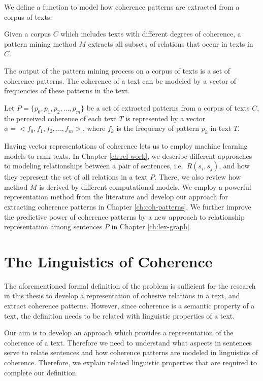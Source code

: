 We define a function to model how coherence patterns are extracted from a corpus of texts. 

\begin{definition}
Given a corpus $C$ which includes texts with different degrees of coherence, a pattern mining method $M$ extracts all subsets of relations that occur in texts in $C$. 
\end{definition} 

The output of the pattern mining process on a corpus of texts is a set of coherence patterns. 
The coherence of a text can be modeled by a vector of frequencies of these patterns in the text. 

\begin{definition}
Let $P=\lbrace p_0,p_1,p_2,...,p_m \rbrace$ be a set of extracted patterns from a corpus of texts $C$, the perceived coherence of each text $T$ is represented by a vector $\phi = <f_0, f_1, f_2,...,f_m>$, where $f_k$ is the frequency of pattern $p_k$ in text $T$. 
\end{definition}

Having vector representations of coherence lets us to employ machine learning models to rank texts. 
In Chapter \ref{ch:rel-work}, we describe different approaches to modeling relationships between a pair of sentences, i.e.\ $R(s_i,s_j)$, and how they represent the set of all relations in a text $P$.  
There, we also review how method $M$ is derived by different computational models. 
We employ a powerful representation method from the literature and develop our approach for extracting coherence patterns in Chapter \ref{ch:coh-patterns}. 
We further improve the predictive power of coherence patterns by a new approach to relationship representation among sentences $P$ in Chapter \ref{ch:lex-graph}. 

\section{The Linguistics of Coherence}

The aforementioned formal definition of the problem is sufficient for the research in this thesis to develop a representation of cohesive relations in a text, and extract coherence patterns. 
However, since coherence is a semantic property of a text, the definition needs to be related with linguistic properties of a text. 

Our aim is to develop an approach which provides a representation of the coherence of a text. 
Therefore we need to understand what aspects in sentences serve to relate sentences and how coherence patterns are modeled in linguistics of coherence. 
Therefore, we explain related linguistic properties that are required to complete our definition. 


